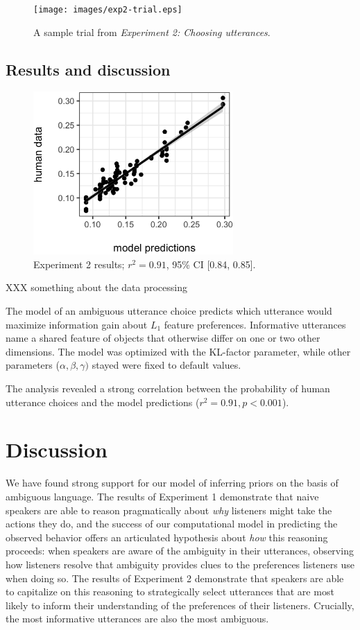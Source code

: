 \documentclass[10pt,a4paper]{article}
\begin{document}
\begin{figure}[ht]
	\centering
	\texttt{[image: images/exp2-trial.eps]}
	\caption{A sample trial from \emph{Experiment 2: Choosing utterances}.}\label{exp2-trial}
\end{figure}

\subsection{Results and discussion}

\begin{figure}[ht]
	\centering
	\includegraphics[width=3in]{images/X3-scatter-CogSci.eps}
	\caption{Experiment 2 results; $r^{2}=0.91$, 95\% CI [0.84, 0.85].}\label{exp2-results}
\end{figure}


XXX something about the data processing

The model of an ambiguous utterance choice predicts which utterance would maximize information gain about $L_1$ feature preferences. Informative utterances name a shared feature of objects that otherwise differ on one or two other dimensions. The model was optimized with the KL-factor parameter, while other parameters ($\alpha, \beta, \gamma)$ stayed were fixed to default values.

The analysis revealed a strong correlation between the probability of human utterance choices and the model predictions ($r^2 = 0.91, p < 0.001$).

\section{Discussion}

We have found strong support for our model of inferring priors on the basis of ambiguous language. The results of Experiment 1 demonstrate that naive speakers are able to reason pragmatically about \emph{why} listeners might take the actions they do, and the success of our computational model in predicting the observed behavior offers an articulated hypothesis about \emph{how} this reasoning proceeds: when speakers are aware of the ambiguity in their utterances, observing how listeners resolve that ambiguity provides clues to the preferences listeners use when doing so. The results of Experiment 2 demonstrate that speakers are able to capitalize on this reasoning to strategically select utterances that are most likely to inform their understanding of the preferences of their listeners. Crucially, the most informative utterances are also the most ambiguous.
\end{document}
